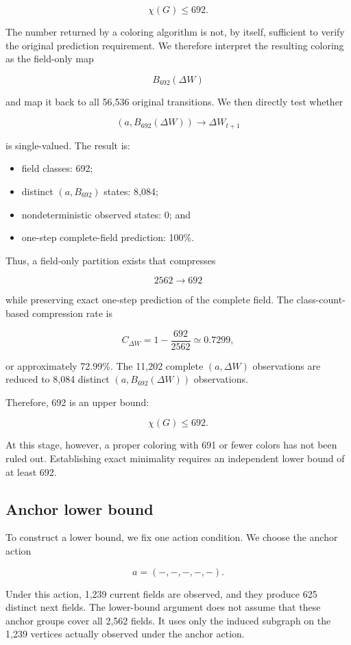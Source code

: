 \documentclass[
  11pt,
]{article}
\providecommand{\tightlist}{%
  \setlength{\itemsep}{0pt}\setlength{\parskip}{0pt}}
\begin{document}
\[{\chi(G)\le692.}\]

The number returned by a coloring algorithm is not, by itself,
sufficient to verify the original prediction requirement. We therefore
interpret the resulting coloring as the field-only map

\[{B_{692}(\Delta W)}\]

and map it back to all 56,536 original transitions. We then directly
test whether

\[{(a,B_{692}(\Delta W))\longrightarrow\Delta W_{t+1}}\]

is single-valued. The result is:

\begin{itemize}
\tightlist
\item
  field classes: 692;
\item
  distinct \({(a,B_{692})}\) states: 8,084;
\item
  nondeterministic observed states: 0; and
\item
  one-step complete-field prediction: 100\%.
\end{itemize}

Thus, a field-only partition exists that compresses

\[{2562\longrightarrow692}\]

while preserving exact one-step prediction of the complete field. The
class-count-based compression rate is

\[{C_{\Delta W}=1-\frac{692}{2562}\simeq0.7299,}\]

or approximately 72.99\%. The 11,202 complete \({(a,\Delta W)}\)
observations are reduced to 8,084 distinct \({(a,B_{692}(\Delta W))}\)
observations.

Therefore, 692 is an upper bound:

\[{\boxed{\chi(G)\le692}.}\]

At this stage, however, a proper coloring with 691 or fewer colors has
not been ruled out. Establishing exact minimality requires an
independent lower bound of at least 692.

\hypertarget{anchor-lower-bound}{%
\subsection{Anchor lower bound}\label{anchor-lower-bound}}

To construct a lower bound, we fix one action condition. We choose the
anchor action

\[{a=(-,-,-,-,-).}\]

Under this action, 1,239 current fields are observed, and they produce
625 distinct next fields. The lower-bound argument does not assume that
these anchor groups cover all 2,562 fields. It uses only the induced
subgraph on the 1,239 vertices actually observed under the anchor
action.
\end{document}
